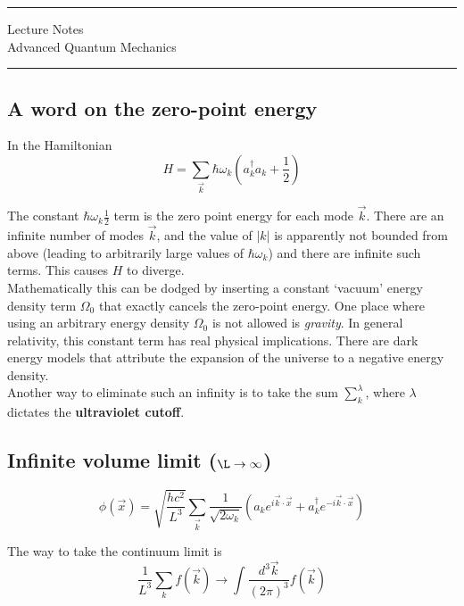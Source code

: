 \documentclass[11pt]{article}
\author{Aayush Arya}
\title{}
\date{January 11, 2023}
\begin{document}
	
	\pagestyle{fancy}
	
	\maketitle \vspace{-6pt}
	\hrule
	\begin{center}
		Lecture Notes \\
		Advanced Quantum Mechanics
	\end{center}
	\hrule
	
	\subsection*{A word on the zero-point energy}
	
	In the Hamiltonian \[ H = \sum_{\vec{k}} \hbar \omega_k \left(a^\dagger_ka _k + \frac{1}{2} \right)\]
	
	The constant $\hbar\omega_k\frac{1}{2}$ term is the zero point energy for each mode $\vec{k}$. There are an infinite number of modes $\vec{k}$, and the value of $|k|$ is apparently not bounded from above (leading to arbitrarily large values of $\hbar \omega_k$) and there are infinite such terms. This causes $H$ to diverge. \\
	
	Mathematically this can be dodged by inserting a constant `vacuum' energy density term $\Omega_0$ that exactly cancels the zero-point energy. One place where using an arbitrary energy density $\Omega_0$ is not allowed is {\it gravity}. In general relativity, this constant term has real physical implications. There are dark energy models that attribute the expansion of the universe to a negative energy density.\\
	
	Another way to eliminate such an infinity is to take the sum $\sum_k^\lambda$, where $\lambda$ dictates the \textbf{ultraviolet cutoff}.
	
	\subsection*{Infinite volume limit ($\L \rightarrow \infty$)}
	
	\[ \phi(\vec{x}) = \sqrt{\frac{hc^2}{L^3}} \sum_{\vec{k}} \frac{1}{\sqrt{2\omega_k}} \left(a_k e^{i\vec{k}\cdot \vec{x}} + a_k^\dagger e^{-i\vec{k}\cdot \vec{x}}\right) \]
	
	The way to take the continuum limit is \[ \frac{1}{L^3} \sum_k f(\vec{k}) \rightarrow \int \frac{d^3 \vec{k}}{(2\pi)^3} f(\vec{k})\]
	
\end{document}
